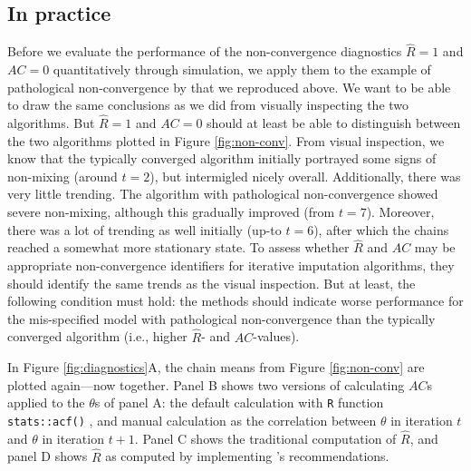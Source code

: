 \documentclass[Royal,times,sageh]{sagej}
\begin{document}
\hypertarget{in-practice}{%
\subsection{In practice}\label{in-practice}}

Before we evaluate the performance of the non-convergence diagnostics \(\widehat{R}=1\) and \(AC=0\) quantitatively through simulation, we apply them to the example of pathological non-convergence by \citet{buur18} that we reproduced above. We want to be able to draw the same conclusions as we did from visually inspecting the two algorithms. But \(\widehat{R}=1\) and \(AC=0\) should at least be able to distinguish between the two algorithms plotted in Figure \ref{fig:non-conv}. From visual inspection, we know that the typically converged algorithm initially portrayed some signs of non-mixing (around \(t=2\)), but intermigled nicely overall. Additionally, there was very little trending. The algorithm with pathological non-convergence showed severe non-mixing, although this gradually improved (from \(t=7\)). Moreover, there was a lot of trending as well initially (up-to \(t=6\)), after which the chains reached a somewhat more stationary state. To assess whether \(\widehat{R}\) and \(AC\) may be appropriate non-convergence identifiers for iterative imputation algorithms, they should identify the same trends as the visual inspection. But at least, the following condition must hold: the methods should indicate worse performance for the mis-specified model with pathological non-convergence than the typically converged algorithm (i.e., higher \(\widehat{R}\)- and \(AC\)-values).

In Figure \ref{fig:diagnostics}A, the chain means from Figure \ref{fig:non-conv} are plotted again---now together. Panel B shows two versions of calculating \(AC\)s applied to the \(\theta\)s of panel A: the default calculation with \texttt{R} function \texttt{stats::acf()} \citep{R}, and manual calculation as the correlation between \(\theta\) in iteration \(t\) and \(\theta\) in iteration \(t+1\). Panel C shows the traditional computation of \(\widehat{R}\), and panel D shows \(\widehat{R}\) as computed by implementing \citet{veht19} 's recommendations.
\end{document}
